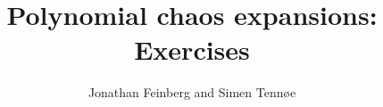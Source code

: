 \documentclass{beamer}
\title{Polynomial chaos expansions: Exercises}
\author{Jonathan Feinberg and Simen Tennøe}
\begin{document}
\begin{frame}
  \maketitle
\end{frame}


%  
%    
%  
%   

\end{document}
